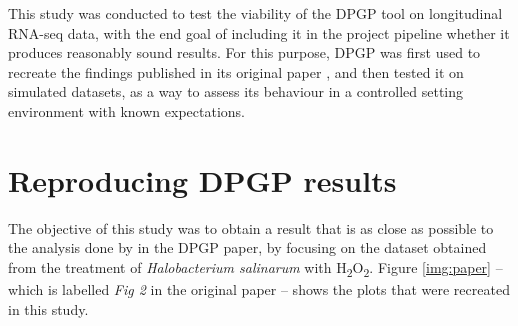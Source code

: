 This study was conducted to test the viability of the DPGP tool on longitudinal RNA-seq data, with the end goal of including it in the project pipeline whether it produces reasonably sound results. For this purpose, DPGP was first used to recreate the findings published in its original paper \citep{mcdowellClusteringGeneExpression2018}, and then tested it on simulated datasets, as a way to assess its behaviour in a controlled setting environment with known expectations.

\section{Reproducing DPGP results}\label{res:geo}
The objective of this study was to obtain a result that is as close as possible to the analysis done by \citeauthor{mcdowellClusteringGeneExpression2018} in the DPGP paper, by focusing on the dataset obtained from the treatment of \textit{Halobacterium salinarum} with H\textsubscript{2}O\textsubscript{2}. Figure \ref{img:paper} -- which is labelled \emph{Fig 2} in the original paper -- shows the plots that were recreated in this study.

